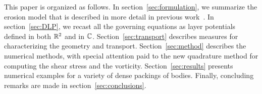 \documentclass{jfm}
\begin{document}

This paper is organized as follows. In section~\ref{sec:formulation}, we
summarize the erosion model that is described in more detail in previous
work~\citep{qua-moo2018}.  In section~\ref{sec:DLP}, we recast all the
governing equations as layer potentials defined in both ${\mathbb{R}}^2$ and in
${\mathbb{C}}$.  Section~\ref{sec:transport} describes measures for
characterizing the geometry and transport. Section~\ref{sec:method}
describes the numerical methods, with special attention paid to the new
quadrature method for computing the shear stress and the vorticity.
Section~\ref{sec:results} presents numerical examples for a variety of
dense packings of bodies.  Finally, concluding remarks are made in
section~\ref{sec:conclusions}.

\end{document}
